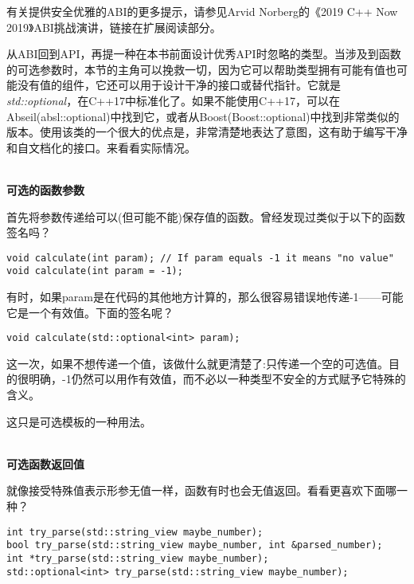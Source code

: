 有关提供安全优雅的ABI的更多提示，请参见Arvid Norberg的《2019 C++ Now 2019》ABI挑战演讲，链接在扩展阅读部分。


从ABI回到API，再提一种在本书前面设计优秀API时忽略的类型。当涉及到函数的可选参数时，本节的主角可以挽救一切，因为它可以帮助类型拥有可能有值也可能没有值的组件，它还可以用于设计干净的接口或替代指针。它就是\textit{std::optional}，在C++17中标准化了。如果不能使用C++17，可以在Abseil(absl::optional)中找到它，或者从Boost(Boost::optional)中找到非常类似的版本。使用该类的一个很大的优点是，非常清楚地表达了意图，这有助于编写干净和自文档化的接口。来看看实际情况。

\hspace*{\fill} \\ %
\noindent
\textbf{可选的函数参数}

首先将参数传递给可以(但可能不能)保存值的函数。曾经发现过类似于以下的函数签名吗？

\begin{lstlisting}[style=styleCXX]
void calculate(int param); // If param equals -1 it means "no value"
void calculate(int param = -1);
\end{lstlisting}

有时，如果param是在代码的其他地方计算的，那么很容易错误地传递-1——可能它是一个有效值。下面的签名呢？

\begin{lstlisting}[style=styleCXX]
void calculate(std::optional<int> param);
\end{lstlisting}

这一次，如果不想传递一个值，该做什么就更清楚了:只传递一个空的可选值。目的很明确，-1仍然可以用作有效值，而不必以一种类型不安全的方式赋予它特殊的含义。

这只是可选模板的一种用法。

\hspace*{\fill} \\ %
\noindent
\textbf{可选函数返回值}

就像接受特殊值表示形参无值一样，函数有时也会无值返回。看看更喜欢下面哪一种？

\begin{lstlisting}[style=styleCXX]
int try_parse(std::string_view maybe_number);
bool try_parse(std::string_view maybe_number, int &parsed_number);
int *try_parse(std::string_view maybe_number);
std::optional<int> try_parse(std::string_view maybe_number);
\end{lstlisting}

